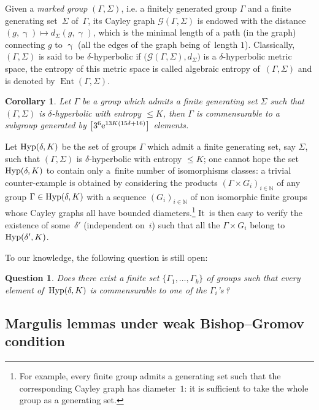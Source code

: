 \documentclass[10pt,a4paper]{amsart}
\providecommand{\cal}{\mathcal}
\numberwithin{equation}{section}
\newtheorem{Corollary}[theor]{Corollary}
\newtheorem{question}[theor]{Question}
\newcommand{\N}{\mathbb{N}}
\newcommand{\Ent}{\operatorname{Ent}}
\newcommand{\g}{\operatorname{\gamma}}
\begin{document}
Given a \emph{marked group} $(\Gamma, \Sigma)$, i.e. a finitely generated group $\Gamma$ and a finite generating set~$\Sigma$ of~$\Gamma$, its Cayley
graph ${\cal G} (\Gamma, \Sigma)$ is endowed with the distance $(g, \g) \mapsto d_\Sigma (g, \g)$, which is the minimal length of a path (in the graph) connecting
$g$ to $\g$ (all the edges of the graph being of~length $1$).
Classically, $ (\Gamma, \Sigma)$ is said to be $\delta$-hyperbolic if $\big({\cal G} (\Gamma, \Sigma), d_\Sigma \big)$ is a $\delta$-hyperbolic metric space, the entropy of
this metric space is called algebraic entropy of~$ (\Gamma, \Sigma)$ and is denoted by $\Ent (\Gamma, \Sigma)$.

\begin{Corollary}%
Let $\Gamma$ be a group which admits a finite generating set $\Sigma$ such that $ (\Gamma, \Sigma)$ is $\delta$-hy\-per\-bolic with entropy $\le K$, then
$\Gamma$ is commensurable to a subgroup generated by $\big[ 3^6 {\rm e}^{13 K
(15 \delta + 16)}\big]$ elements.
\end{Corollary}

Let ${\rm Hyp} (\delta, K)$ be the set of groups $\Gamma$ which admit a finite generating set, say $\Sigma$, such that $ (\Gamma, \Sigma)$ is
$\delta$-hyperbolic with entropy $\le K$; one cannot hope the set ${\rm Hyp} (\delta, K)$ to contain only a~finite number of isomorphisms classes: a trivial counter-example is obtained by considering the products $(\Gamma \times G_i)_{i \in \N}$ of any group $\Gamma \in {\rm Hyp} (\delta, K)$ with a sequence $(G_i)_{i \in \N}$ of non isomorphic finite groups whose Cayley graphs all have bounded diameters.\footnote{For example, every
finite group admits a generating
set such that the corresponding Cayley graph has diameter~$1$: it is sufficient to
take the whole group as a generating set.} It~is then easy to verify the
existence of some~$\delta'$ (independent on~$i$) such that all the $\Gamma \times G_i$ belong to ${\rm Hyp} (\delta', K)$.

To our knowledge, the following question is still open:
\begin{question}
Does there exist a finite set $\{\Gamma_1, \dots, \Gamma_k \}$ of groups such that every element of~${\rm Hyp} (\delta, K)$ is commensurable to one
of the $\Gamma_i$'s\,?
\end{question}

\subsection{Margulis lemmas under weak Bishop--Gromov condition}\label{MargLemme0}
\end{document}

